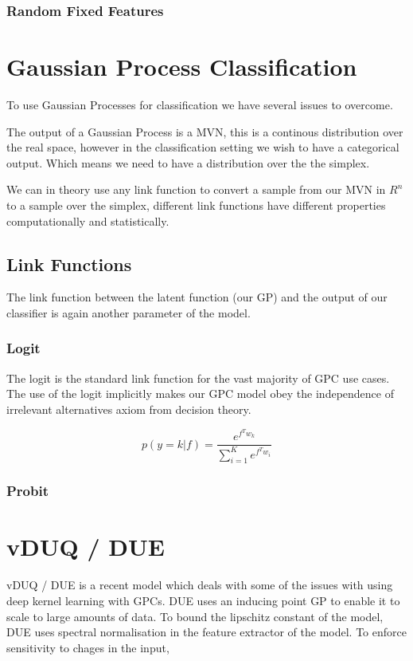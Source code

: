 \documentclass[12pt, a4paper]{report}
\theoremstyle{definition}
\begin{document}
\subsubsection{Random Fixed Features}

\section{Gaussian Process Classification}


To use Gaussian Processes for classification we have several issues to overcome.

The output of a Gaussian Process is a MVN, this is a continous distribution over the real space, however in the classification setting we wish to have a categorical output. Which means we need to have a distribution over the the simplex.

We can in theory use any link function to convert a sample from our MVN in $R^n$ to a sample over the simplex, different link functions have different properties computationally and statistically.

\subsection{Link Functions}

The link function between the latent function (our GP) and the output of our classifier is again another parameter of the model.

\subsubsection{Logit}

The logit is the standard link function for the vast majority of GPC use cases. The use of the logit implicitly makes our GPC model obey the independence of irrelevant alternatives axiom from decision theory. 


$$p\left( y = k | f\right) = \frac{e^{f^T w_k}}{\sum_{i=1}^{K} e^{f^T w_i}}$$
\subsubsection{Probit}



\section{vDUQ / DUE}

vDUQ / DUE \cite{vanamersfoort2020uncertainty} is a recent model which deals with some of the issues with using deep kernel learning with GPCs. DUE uses an inducing point GP to enable it to scale to large amounts of data. To bound the lipschitz constant of the model, DUE uses spectral normalisation in the feature extractor of the model.
To enforce sensitivity to chages in the input, 
\end{document}
